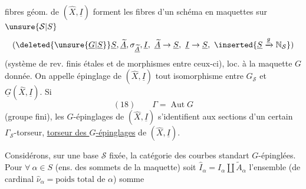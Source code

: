 fibres géom. de $(\widehat X,\underline I)$ forment les fibres d'un schéma en maquettes  sur $\unsure{\mathcal S|S}$
\[
(\deleted{\unsure{\underline G|\underline S}}\underline S,\underline{\widetilde A},\sigma_{\underline{\widetilde A}},\underline I,\ \underline{\widetilde A}\to\underline S,\ \underline I\to\underline S,\ \inserted{\underline S\xrightarrow{\underline g}\mathbb N_{\mathcal S}})
\]
(système de rev. finis étales  et de morphismes entre ceux-ci), loc.  à la maquette $G$ donnée.  On appelle épinglage de $(\widehat X,\underline I)$ tout isomorphisme entre $G_{\mathcal S}$ et $\underline G(\widehat X,\underline I)$. Si \deleted{$\Gamma$}
\[
(18)\qquad\Gamma=\operatorname{Aut}G
\]
(groupe fini), les $G$-épinglages de $(\widehat X,\underline I)$ s'identifient aux sections d'un certain $\Gamma_{\mathcal S}$-torseur,  \uline{torseur des $G$-épinglages} de $(\widehat X,\underline I)$.

Considérons, sur une base $\mathcal S$ fixée, la catégorie  des courbes standart $G$-épinglées. Pour $\forall\ \alpha\in S$ (ens. des sommets de la maquette) soit $\widehat I_\alpha=I_\alpha\amalg\widetilde A_\alpha$ l'ensemble (de cardinal $\widehat\nu_\alpha=\text{poids total de }\alpha$) somme

